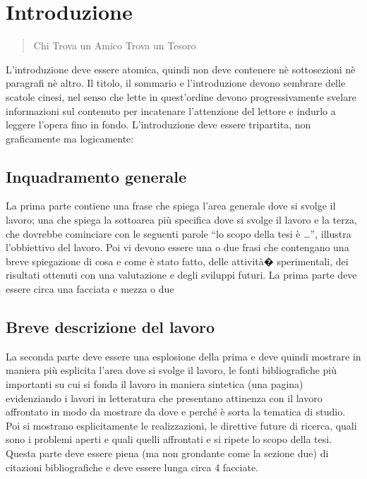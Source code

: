 \chapter{Introduzione}
\label{Introduzione}
\thispagestyle{empty}

\begin{quotation}
{\footnotesize
{}
\begin{flushright}
Chi Trova un Amico Trova un Tesoro
\end{flushright}
}
\end{quotation}
\vspace{0.5cm}

\noindent L'introduzione deve essere atomica, quindi non deve contenere n\`e sottosezioni n\`e paragrafi n\`e altro. Il titolo, il sommario e l'introduzione devono sembrare delle scatole cinesi, nel senso che lette in quest'ordine devono progressivamente svelare informazioni sul contenuto per incatenare l'attenzione del lettore e indurlo a leggere l'opera fino in fondo. L'introduzione deve essere tripartita, non graficamente ma logicamente:

\section{Inquadramento generale}
La prima parte contiene una frase che spiega l'area generale dove si svolge il lavoro; una che spiega la sottoarea pi\`u specifica dove si svolge il lavoro e la terza, che dovrebbe cominciare con le seguenti parole ``lo scopo della tesi \`e \dots'', illustra l'obbiettivo del lavoro. Poi vi devono essere una o due frasi che contengano una breve spiegazione di cosa e come \`e stato fatto, delle attivit\`a� sperimentali, dei risultati ottenuti con una valutazione e degli sviluppi futuri. La prima parte deve essere circa una facciata e mezza o due

\section{Breve descrizione del lavoro}
La seconda parte deve essere una esplosione della prima e deve quindi mostrare in maniera pi\`u esplicita l'area dove si svolge il lavoro, le fonti bibliografiche pi\`u importanti su cui si fonda il lavoro in maniera sintetica (una pagina) evidenziando i lavori in letteratura che presentano attinenza con il lavoro affrontato in modo da mostrare da dove e perch\'e \`e sorta la tematica di studio. Poi si mostrano esplicitamente le realizzazioni, le direttive future di ricerca, quali sono i problemi aperti e quali quelli affrontati e si ripete lo scopo della tesi. Questa parte deve essere piena (ma non grondante come la sezione due) di citazioni bibliografiche e deve essere lunga circa 4 facciate.

